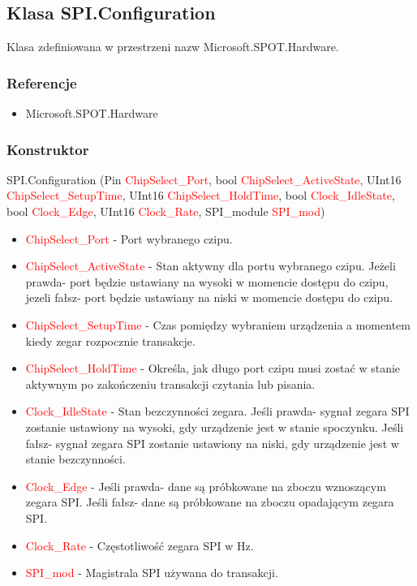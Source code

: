 \documentclass{article}
\begin{document}
\newpage
\subsection{Klasa SPI.Configuration}
Klasa zdefiniowana w przestrzeni nazw Microsoft.SPOT.Hardware. 
\subsubsection{Referencje}
\begin{itemize}
\item Microsoft.SPOT.Hardware
\end{itemize}
\subsubsection{Konstruktor}
SPI.Configuration (Pin \textcolor{red}{ChipSelect\_Port}, bool \textcolor{red}{ChipSelect\_ActiveState}, \newline UInt16 \textcolor{red}{ChipSelect\_SetupTime}, UInt16 \textcolor{red}{ChipSelect\_HoldTime},  bool \textcolor{red}{Clock\_IdleState}, bool \textcolor{red}{Clock\_Edge}, UInt16 \textcolor{red}{Clock\_Rate}, SPI\_module \textcolor{red}{SPI\_mod})
\begin{itemize}
\item \textcolor{red}{ChipSelect\_Port} - Port wybranego czipu.
\item \textcolor{red}{ChipSelect\_ActiveState} - Stan aktywny dla portu wybranego czipu. Jeżeli prawda- port będzie ustawiany na wysoki w momencie dostępu do czipu, jezeli fałsz- port będzie ustawiany na niski w momencie dostępu do czipu.
\item \textcolor{red}{ChipSelect\_SetupTime} - Czas pomiędzy wybraniem urządzenia a momentem kiedy zegar rozpocznie transakcje. 
\item \textcolor{red}{ChipSelect\_HoldTime} - Określa, jak długo port czipu musi zostać w stanie aktywnym po zakończeniu transakcji czytania lub pisania.
\item \textcolor{red}{Clock\_IdleState} - Stan bezczynności zegara. Jeśli prawda- sygnał zegara SPI zostanie ustawiony na wysoki, gdy urządzenie jest w stanie spoczynku. Jeśli fałsz- sygnał zegara SPI zostanie ustawiony na niski, gdy urządzenie jest w stanie bezczynności. 
\item \textcolor{red}{Clock\_Edge} - Jeśli prawda- dane są próbkowane na zboczu wznoszącym zegara SPI. Jeśli fałsz- dane są próbkowane na zboczu opadającym zegara SPI.
\item \textcolor{red}{Clock\_Rate} - Częstotliwość zegara SPI w Hz.
\item \textcolor{red}{SPI\_mod} - Magistrala SPI używana do transakcji.
\end{itemize}
\end{document}
